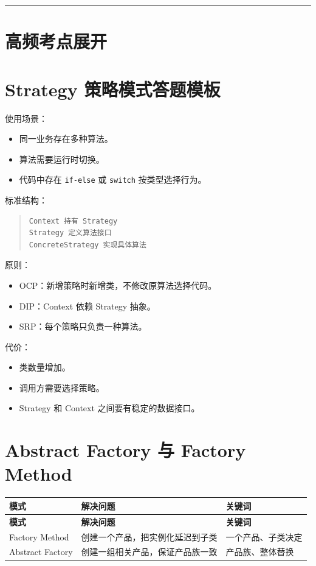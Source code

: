 \documentclass[UTF8,zihao=-4]{ctexart}
\begin{document}
\bigskip\hrule\bigskip

\section{高频考点展开}

\section{Strategy 策略模式答题模板}

使用场景：

\begin{itemize}
\item 同一业务存在多种算法。
\item 算法需要运行时切换。
\item 代码中存在 \texttt{if-else} 或 \texttt{switch} 按类型选择行为。
\end{itemize}

标准结构：

\begin{quote}
\footnotesize
\begin{verbatim}
Context 持有 Strategy
Strategy 定义算法接口
ConcreteStrategy 实现具体算法
\end{verbatim}
\end{quote}

原则：

\begin{itemize}
\item OCP：新增策略时新增类，不修改原算法选择代码。
\item DIP：Context 依赖 Strategy 抽象。
\item SRP：每个策略只负责一种算法。
\end{itemize}

代价：

\begin{itemize}
\item 类数量增加。
\item 调用方需要选择策略。
\item Strategy 和 Context 之间要有稳定的数据接口。
\end{itemize}

\section{Abstract Factory 与 Factory Method}

{
\footnotesize
\begin{longtable}{|>{\raggedright\arraybackslash}p{}|>{\raggedright\arraybackslash}p{}|>{\raggedright\arraybackslash}p{}|}
\hline
\textbf{模式} & \textbf{解决问题} & \textbf{关键词} \\
\hline
\endfirsthead
\hline
\textbf{模式} & \textbf{解决问题} & \textbf{关键词} \\
\hline
\endhead
Factory Method & 创建一个产品，把实例化延迟到子类 & 一个产品、子类决定 \\
\hline
Abstract Factory & 创建一组相关产品，保证产品族一致 & 产品族、整体替换 \\
\hline
\end{longtable}
}
\end{document}

